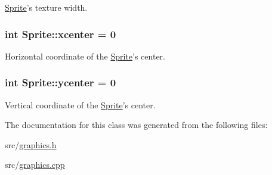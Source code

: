 \hyperlink{class_sprite}{Sprite}'s texture width. 

\hypertarget{class_sprite_a4fc7935f0e4e38f0960a412293c87ab2}{
\subsubsection[{xcenter}]{\setlength{\rightskip}{0pt plus 5cm}int Sprite\-::xcenter = 0\hspace{0.3cm}{\ttfamily [protected]}}}\label{class_sprite_a4fc7935f0e4e38f0960a412293c87ab2}


Horizontal coordinate of the \hyperlink{class_sprite}{Sprite}'s center. 

\hypertarget{class_sprite_a5b63544c1057e1d90ccb4fb573e6db27}{
\subsubsection[{ycenter}]{\setlength{\rightskip}{0pt plus 5cm}int Sprite\-::ycenter = 0\hspace{0.3cm}{\ttfamily [protected]}}}\label{class_sprite_a5b63544c1057e1d90ccb4fb573e6db27}


Vertical coordinate of the \hyperlink{class_sprite}{Sprite}'s center. 



The documentation for this class was generated from the following files\-:\begin{DoxyCompactItemize}
\item 
src/\hyperlink{graphics_8h}{graphics.\-h}\item 
src/\hyperlink{graphics_8cpp}{graphics.\-cpp}\end{DoxyCompactItemize}
